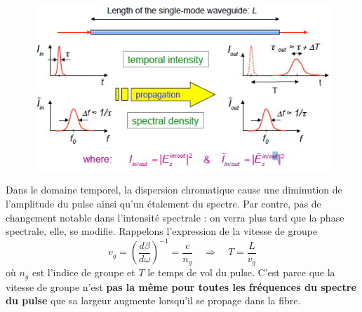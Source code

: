 	\newpage
	\begin{figure}
	\includegraphics[scale=0.6]{ch1/image32}
	\end{figure}	
	Dans le domaine temporel, la dispersion chromatique cause une diminution de l'amplitude du
	pulse ainsi qu'un étalement du spectre. Par contre, pas de changement notable dans l'intensité
	spectrale : on verra plus tard que la phase spectrale, elle, se modifie. Rappelons l'expression
	de la vitesse de groupe
	\begin{equation}
	v_g = \left(\dfrac{d\beta}{d\omega}\right)^{-1} = \dfrac{c}{n_g} \quad\Rightarrow\quad
	T = \dfrac{L}{v_g}
	\end{equation}
	où $n_g$ est l'indice de groupe et $T$ le temps de vol du pulse. C'est parce que la vitesse
	de groupe n'est \textbf{pas la même pour toutes les fréquences du spectre du pulse} que sa
	largeur augmente lorsqu'il se propage dans la fibre.\\
	

